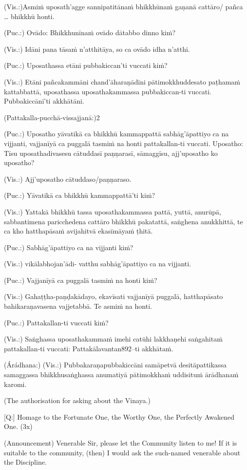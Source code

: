 (Vis.:)Asmiṁ uposath'agge sannipatitānaṁ bhikkhūnaṁ gaṇanā cattāro/
pañca … bhikkhū honti.

(Puc.:) Ovādo: Bhikkhunīnaṁ ovādo dātabbo dinno kiṁ?

(Vis.:) Idāni pana tāsaṁ n’atthitāya, so ca ovādo idha n’atthi.

(Puc.:) Uposathassa etāni pubbakiccan’ti vuccati kiṁ?

(Vis.:) Etāni pañcakammāni chand'āharaṇādīni pātimokkhuddesato
paṭhamaṁ kattabbattā, uposathassa uposathakammassa pubbakiccan-ti
vuccati. Pubbakiccānī'ti akkhātāni.

(Pattakalla-pucchā-vissajjanā:)2

(Puc.:) Uposatho yāvatikā ca bhikkhū kammappattā sabhāg'āpattiyo ca na
vijjanti, vajjanīyā ca puggalā tasmiṁ na honti pattakallan-ti vuccati.
Uposatho: Tīsu uposathadivasesu cātuddasī paṇṇarasī, sāmaggīsu,
ajj’uposatho ko uposatho?

(Vis.:) Ajj’uposatho cātuddaso/paṇṇaraso.

(Puc.:) Yāvatikā ca bhikkhū kammappattā'ti kiṁ?

(Vis.:) Yattakā bhikkhū tassa uposathakammassa pattā, yuttā, anurūpā,
sabbantimena paricchedena cattāro bhikkhū pakatattā, saṅghena
anukkhittā, te ca kho hatthapāsaṁ avijahitvā ekasīmāyaṁ ṭhitā.

(Puc.:) Sabhāg'āpattiyo ca na vijjanti kiṁ?

(Vis.:) vikālabhojan'ādi- vatthu sabhāg'āpattiyo ca na vijjanti.

(Puc.:) Vajjanīyā ca puggalā tasmiṁ na honti kiṁ?

(Vis.:) Gahaṭṭha-paṇḍakādayo, ekavīsati vajjanīyā puggalā, hatthapāsato
bahikaraṇavasena vajjetabbā. Te asmiṁ na honti.

(Puc.:) Pattakallan-ti vuccati kiṁ?

(Vis.:) Saṅghassa uposathakammaṁ imehi catūhi lakkhaṇehi saṅgahitaṁ
pattakallan-ti vuccati: Pattakālavantan892–ti akkhātaṁ.

(Árádhana:)
(Vis.:) Pubbakaraṇapubbakiccāni samāpetvā desitāpattikassa samaggassa
bhikkhusaṅghassa anumatiyā pātimokkhaṁ uddisituṁ ārādhanaṁ
karomi.

\clearpage

(The authorisation for asking about the Vinaya.)

[Q:] Homage to the Fortunate One, the Worthy One, the Perfectly
Awakened One. (3x)

(Announcement)
Venerable Sir, please let the Community listen to me! If it is suitable
to the community, (then) I would ask the such-named venerable
about the Discipline.

